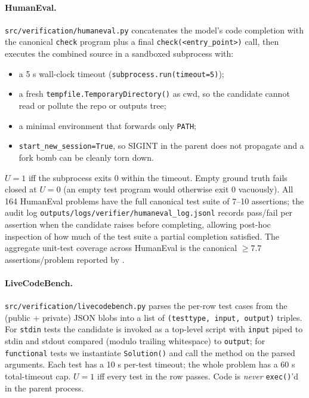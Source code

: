 \paragraph{HumanEval.}
\texttt{src/verification/humaneval.py} concatenates the model's code
completion with the canonical \texttt{check} program plus a final
\texttt{check(<entry\_point>)} call, then executes the combined source
in a sandboxed subprocess with:
\begin{itemize}
\item a 5 s wall-clock timeout (\texttt{subprocess.run(timeout=5)});
\item a fresh \texttt{tempfile.TemporaryDirectory()} as cwd, so the
      candidate cannot read or pollute the repo or outputs tree;
\item a minimal environment that forwards only \texttt{PATH};
\item \texttt{start\_new\_session=True}, so SIGINT in the parent does
      not propagate and a fork bomb can be cleanly torn down.
\end{itemize}
$U{=}1$ iff the subprocess exits 0 within the timeout. Empty ground
truth fails closed at $U{=}0$ (an empty test program would otherwise
exit 0 vacuously). All 164 HumanEval problems have the full canonical
test suite of 7--10 assertions; the audit log
\texttt{outputs/logs/verifier/humaneval\_log.jsonl} records pass/fail
per assertion when the candidate raises before completing, allowing
post-hoc inspection of how much of the test suite a partial completion
satisfied. The aggregate unit-test coverage across HumanEval is the
canonical $\geq 7.7$ assertions/problem reported by \citet{chen2021codex}.

\paragraph{LiveCodeBench.}
\texttt{src/verification/livecodebench.py} parses the per-row test
cases from the (public + private) JSON blobs into a list of
\texttt{(testtype, input, output)} triples. For \texttt{stdin} tests
the candidate is invoked as a top-level script with \texttt{input}
piped to stdin and stdout compared (modulo trailing whitespace) to
\texttt{output}; for \texttt{functional} tests we instantiate
\texttt{Solution()} and call the method on the parsed arguments. Each
test has a 10 s per-test timeout; the whole problem has a 60 s
total-timeout cap. $U{=}1$ iff every test in the row passes. Code is
\emph{never} \texttt{exec()}'d in the parent process.

